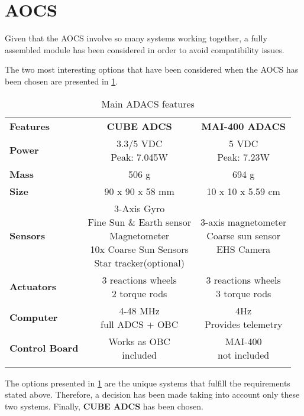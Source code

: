 \section{AOCS} \label{Appendix:AOCS}
Given that the AOCS involve so many systems working together, a fully assembled module has been considered in order to avoid compatibility issues. 

The two most interesting options that have been considered when the AOCS has been chosen are presented in \ref{ADACS}.

\begin{longtable}{| l | c | c |}
	\hline
	\rowcolor[gray]{0.60} \multicolumn{3}{|c|}{\textbf{ADACS options }} \\
	\hline
	\hline
	\rowcolor[gray]{0.75}	\textbf{Features} &  \textbf{CUBE ADCS} & \textbf{MAI-400 ADACS} \\
	\hline
	\cellcolor[gray]{0.85} \textbf{Power} &\makecell{3.3/5 VDC\\ Peak: 7.045W }&  \makecell{5 VDC\\Peak: 7.23W}  \\ 	\hline
	\cellcolor[gray]{0.85} \textbf{Mass} & 506 g& 694 g\\ \hline
	\cellcolor[gray]{0.85} \textbf{Size} & 90 x 90 x 58 mm&10 x 10 x 5.59 cm \\ \hline
	\cellcolor[gray]{0.85} \textbf{Sensors} & \makecell{3-Axis Gyro\\Fine Sun \& Earth sensor \\ Magnetometer\\10x Coarse Sun Sensors \\Star tracker(optional)}& \makecell{3-axis magnetometer \\Coarse sun sensor\\EHS Camera}\\ 	\hline
	\cellcolor[gray]{0.85} \textbf{Actuators} &  \makecell{3 reactions wheels\\2 torque rods} & \makecell{3 reactions wheels\\3 torque rods}\\ 	\hline
	\cellcolor[gray]{0.85} \textbf{Computer} &\makecell{4-48 MHz\\ full ADCS + OBC}  & \makecell{4Hz\\Provides telemetry}\\ \hline
	\cellcolor[gray]{0.85} \textbf{Control Board} & \makecell{Works as OBC\\included}& \makecell{MAI-400\\ not included}\\
	\hline
	\caption{Main ADACS features}
	\label{ADACS}
\end{longtable}

The options presented in \ref{ADACS} are the unique systems that fulfill the requirements stated above. Therefore, a decision has been made taking into account only these two systems. Finally, \textbf{CUBE ADCS} has been chosen.